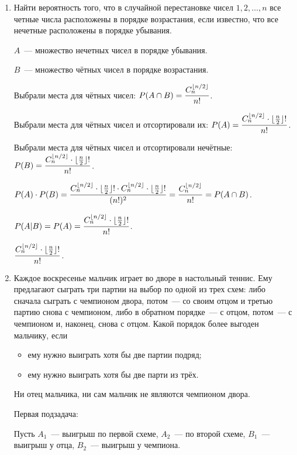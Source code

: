 \documentclass{article}
\begin{document}
\begin{enumerate}
    \item Найти вероятность того, что в случайной перестановке чисел $1, 2, \ldots, n$ все четные числа расположены в порядке возрастания, если известно, что все нечетные расположены в порядке убывания. 

    \solution{}

    $A$~--- множество нечетных чисел в порядке убывания.

    $B$~--- множество чётных чисел в порядке возрастания.

    Выбрали места для чётных чисел: $\displaystyle{P(A \cap B) = \frac{C_n^{\lfloor n / 2 \rfloor}}{n!}}$.

    Выбрали места для чётных чисел и отсортировали их: $\displaystyle{P(A) = \frac{C_n^{\lfloor n / 2 \rfloor} \cdot \lfloor\frac{n}{2}\rfloor !}{n!}}$.

    Выбрали места для чётных чисел и отсортировали нечётные: $\displaystyle{P(B) = \frac{C_n^{\lfloor n / 2 \rfloor} \cdot \lfloor\frac{n}{2}\rfloor !}{n!}}$.

    $\displaystyle{P(A) \cdot P(B) = \frac{C_n^{\lfloor n / 2 \rfloor} \cdot \lfloor\frac{n}{2}\rfloor ! \cdot C_n^{\lfloor n / 2 \rfloor} \cdot \lfloor\frac{n}{2}\rfloor !}{(n!) ^ 2}} = \frac{C_n^{\lfloor n / 2 \rfloor}}{n!} = P(A \cap B)$.

    $\displaystyle{P(A|B) = P(A) = \frac{C_n^{\lfloor n / 2 \rfloor} \cdot \lfloor\frac{n}{2}\rfloor !}{n!}}$.

    \answer{} $\displaystyle{\frac{C_n^{\lfloor n / 2 \rfloor} \cdot \lfloor\frac{n}{2}\rfloor !}{n!}}$.

    \item Каждое воскресенье мальчик играет во дворе в настольный теннис. Ему предлагают сыграть три партии на выбор по одной из трех схем: либо сначала сыграть с чемпионом двора, потом~--- со своим отцом и третью партию снова с чемпионом, либо в обратном порядке~--- с отцом, потом~--- с чемпионом и, наконец, снова с отцом. Какой порядок более выгоден мальчику, если
    \begin{itemize}
        \item ему нужно выиграть хотя бы две партии подряд;
        \item ему нужно выиграть хотя бы две парти из трёх.
    \end{itemize}
    Ни отец мальчика, ни сам мальчик не являются чемпионом двора.

    \solution{}

    Первая подзадача:

    Пусть $A_1$~--- выигрыш по первой схеме, $A_2$~--- по второй схеме, $B_1$~--- выигрыш у отца, $B_2$~--- выигрыш у чемпиона.


\end{enumerate}
\end{document}
